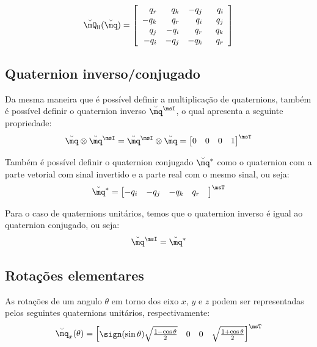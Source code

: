 \documentclass[]{politex}
\begin{document}
\begin{equation} \label{eq:ProdQuat2}
\breve{\mQ}_{\mathsf{I}\mathsf{I}} (\breve{\mq}) =
\begin{bmatrix}
\begin{array}{rrrr}
q_r & q_k & -q_j & \;\; q_i \\
-q_k & q_r & q_i & \;\; q_j \\
q_j & -q_i & q_r & \;\; q_k \\
-q_i & -q_j & - q_k  & \;\; q_r
\end{array}
\end{bmatrix}
\end{equation}

\subsection{Quaternion inverso/conjugado}
Da mesma maneira que é possível definir a multiplicação de quaternions, também é possível definir o quaternion inverso $\breve{\mq}^\msI$, o qual apresenta a seguinte propriedade:
\begin{equation}
\breve{\mq} \otimes \breve{\mq}^\msI = \breve{\mq}^\msI \otimes \breve{\mq} = \begin{bmatrix}
0 & 0 & 0 & 1
\end{bmatrix}^\msT
\end{equation}

Também é possível definir o quaternion conjugado $\breve{\mq}^*$ como o quaternion com a parte vetorial com sinal invertido e a parte real com o mesmo sinal, ou seja:
\begin{equation}
\breve{\mq}^* = \begin{bmatrix}
-q_i & -q_j & -q_k & q_r &
\end{bmatrix}^\msT
\end{equation}

Para o caso de quaternions unitários, temos que o quaternion inverso é igual ao quaternion conjugado, ou seja:
\begin{equation}
\breve{\mq}^\msI = \breve{\mq}^*
\end{equation}

\subsection{Rotações elementares}
As rotações de um angulo $\theta$ em torno dos eixo $x$, $y$ e $z$ podem ser representadas pelos seguintes quaternions unitários, respectivamente:
\begin{equation}
\breve{\mq}_x (\theta) = \begin{bmatrix}
\sign(\sin\theta) \sqrt{\frac{1-\cos\theta}{2}} & 0 & 0 & \sqrt{\frac{1+\cos\theta}{2}}
\end{bmatrix}^\msT
\end{equation}
\end{document}
